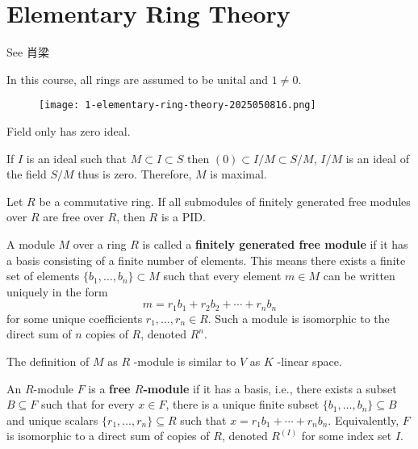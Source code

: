 \section{Elementary Ring Theory}

See 肖梁

In this course, all rings are assumed to be unital and $1 \neq 0$.

\begin{figure}[H]
\centering
\texttt{[image: 1-elementary-ring-theory-2025050816.png]}
\label{}
\end{figure}

\begin{note}
Field only has zero ideal.
\end{note}
If $I$ is an ideal such that $M\subset I\subset S$ then $(0)\subset I/M\subset S/M$, $I/M$ is an ideal of the field $S/M$ thus is zero. Therefore, $M$ is maximal.

\begin{exercise}
Let $R$ be a commutative ring. If all submodules of finitely generated free modules over $R$ are free over $R$, then $R$ is a PID.
\end{exercise}
\begin{definition}
A module $M$ over a ring $R$ is called a \textbf{finitely generated free module} if it has a basis consisting of a finite number of elements.
This means there exists a finite set of elements $\{b_1, \ldots, b_n\} \subset M$ such that every element $m \in M$ can be written uniquely in the form
\[
m = r_1 b_1 + r_2 b_2 + \cdots + r_n b_n
\]for some unique coefficients $r_1, \ldots, r_n \in R$.
Such a module is isomorphic to the direct sum of $n$ copies of $R$, denoted $R^n$.
\end{definition}
\begin{note}
The definition of $M$ as $R$ -module  is similar to $V$ as $K$ -linear space.
\end{note}
\begin{definition}
An $R$-module $F$ is a \textbf{free $R$-module} if it has a basis, i.e., there exists a subset $B \subseteq F$ such that for every $x \in F$, there is a unique finite subset $\{b_1, \ldots, b_n\} \subseteq B$ and unique scalars $\{r_1, \ldots, r_n\} \subseteq R$ such that $x = r_1 b_1 + \cdots + r_n b_n$. Equivalently, $F$ is isomorphic to a direct sum of copies of $R$, denoted $R^{(I)}$ for some index set $I$.
\end{definition}
